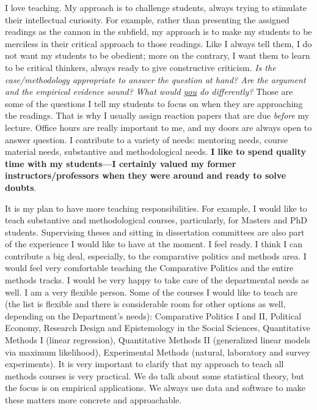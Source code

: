 \documentclass[10pt,stdletter,dateno,sigleft]{newlfm} %
\begin{document}
\begin{newlfm}
I love teaching. My approach is to challenge students, always trying to stimulate their intellectual curiosity. For example, rather than presenting the assigned readings as the cannon in the subfield, my approach is to make my students to be merciless in their critical approach to those readings. Like I always tell them, I do not want my students to be obedient; more on the contrary, I want them to learn to be critical thinkers, always ready to give constructive criticism. \emph{Is the case/methodology appropriate to answer the question at hand? Are the argument and the empirical evidence sound? What would \underline{you} do differently?} Those are some of the questions I tell my students to focus on when they are approaching the readings. That is why I usually assign reaction papers that are due \emph{before} my lecture. Office hours are really important to me, and my doors are always open to answer question. I contribute to a variety of needs: mentoring needs, course material needs, substantive and methodological needs. {\bf I like to spend quality time with my students---I certainly valued my former instructors/professors when they were around and ready to solve doubts}. 

It is my plan to have more teaching responsibilities. For example, I would like to teach substantive and methodological courses, particularly, for Masters and PhD students. Supervising theses and sitting in dissertation committees are also part of the experience I would like to have at the moment. I feel ready. I think I can contribute a big deal, especially, to the comparative politics and methods area. I would feel very comfortable teaching the Comparative Politics and the entire methods tracks. I would be very happy to take care of the departmental needs as well. I am a very flexible person. Some of the courses I would like to teach are (the list is flexible and there is considerable room for other options as well, depending on the Department's needs): Comparative Politics I and II, Political Economy, Research Design and Epistemology in the Social Sciences, Quantitative Methods I (linear regression), Quantitative Methods II (generalized linear models via maximum likelihood), Experimental Methods (natural, laboratory and survey experiments). It is very important to clarify that my approach to teach all methods courses is very practical. We do talk about some statistical theory, but the focus is on empirical applications. We always use data and software to make these matters more concrete and approachable.


\end{newlfm}
\end{document}
